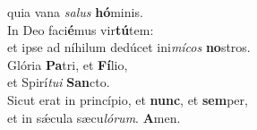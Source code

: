 \oddverse quia vana \textit{sa}\textit{lus} \textbf{hó}minis.\\
\evenverse In Deo faci\textbf{é}mus vir\textbf{tú}tem:~\*\\
\evenverse et ipse ad níhilum dedúcet ini\textit{mí}\textit{cos} \textbf{no}stros.\\
\oddverse Glória \textbf{Pa}tri, et \textbf{Fí}lio,~\*\\
\oddverse et Spirí\textit{tu}\textit{i} \textbf{San}cto.\\
\evenverse Sicut erat in princípio, et \textbf{nunc}, et \textbf{sem}per,~\*\\
\evenverse et in sǽcula sæcu\textit{ló}\textit{rum}. \textbf{A}men.\\
